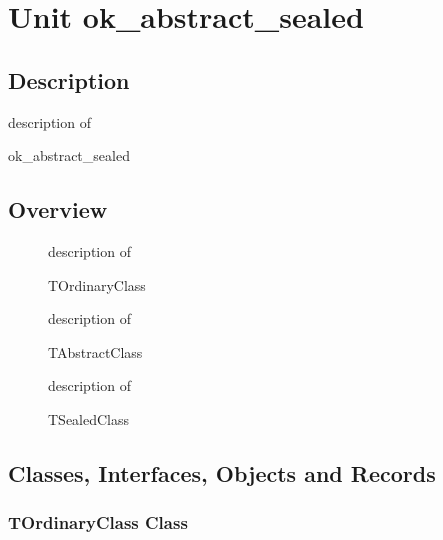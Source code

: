 \documentclass{report}
\newif\ifpdf
\begin{document}
\label{toc}\tableofcontents
\newpage
\newlength{\tmplength}
\chapter{Unit ok{\_}abstract{\_}sealed}
\label{ok_abstract_sealed}
\section{Description}
description of \begin{ttfamily}ok{\_}abstract{\_}sealed\end{ttfamily}
\section{Overview}
\begin{description}
\item[\texttt{\begin{ttfamily}TOrdinaryClass\end{ttfamily} Class}]description of \begin{ttfamily}TOrdinaryClass\end{ttfamily}
\item[\texttt{\begin{ttfamily}TAbstractClass\end{ttfamily} Class}]description of \begin{ttfamily}TAbstractClass\end{ttfamily}
\item[\texttt{\begin{ttfamily}TSealedClass\end{ttfamily} Class}]description of \begin{ttfamily}TSealedClass\end{ttfamily}
\end{description}
\section{Classes, Interfaces, Objects and Records}
\ifpdf
\subsection*{\large{\textbf{TOrdinaryClass Class}}\normalsize\hspace{1ex}\hrulefill}
\else
\subsection*{TOrdinaryClass Class}
\fi
\label{ok_abstract_sealed.TOrdinaryClass}
\end{document}
